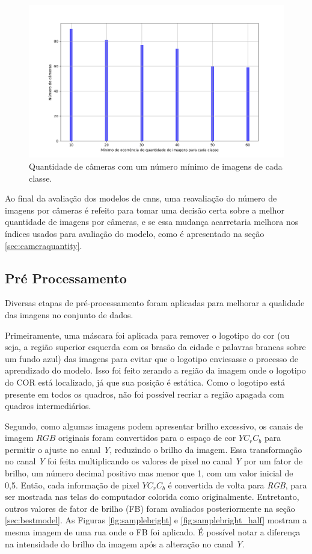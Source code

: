 \begin{figure}[htb]
\centerline{\includegraphics[width=1\linewidth]{images/balancedcodes.png}}
\caption{Quantidade de câmeras com um número mínimo de imagens de cada classe.}
\label{fig:balancedcodes}
\end{figure}

Ao final da avaliação dos modelos de \acrshort{cnn}s, uma reavaliação do número de imagens por câmeras é refeito para tomar uma decisão certa sobre a melhor quantidade de imagens por câmeras, 
e se essa mudança acarretaria melhora nos índices usados para avaliação do modelo, como é apresentado na seção \ref{sec:cameraquantity}.
\subsection{Pré Processamento}\label{subsec:datapreprocessing}

Diversas etapas de pré-processamento foram aplicadas para melhorar a qualidade das imagens no conjunto de dados.

Primeiramente, uma máscara foi aplicada para remover o logotipo do \acrshort{cor} (ou seja, a região superior esquerda com os brasão da cidade e palavras brancas sobre um fundo azul) das imagens para evitar que o logotipo enviesasse o processo de aprendizado do modelo. Isso foi feito zerando a região da imagem onde o logotipo do COR está localizado, já que sua posição é estática. Como o logotipo está presente em todos os quadros, não foi possível recriar a região apagada com quadros intermediários.

Segundo, como algumas imagens podem apresentar brilho excessivo, os canais de imagem $RGB$ originais foram convertidos para o espaço de cor $YC_rC_b$ para permitir o ajuste no canal \textit{Y}, 
reduzindo o brilho da imagem. Essa transformação no canal \textit{Y} foi feita multiplicando os valores de pixel no canal \textit{Y} por um fator de brilho, 
um número decimal positivo mas menor que 1, com um valor inicial de 0,5. 
Então, cada informação de pixel $YC_rC_b$ é convertida de volta para  \textit{RGB}, para ser mostrada nas telas do computador colorida como originalmente. 
Entretanto, outros valores de fator de brilho (FB) foram avaliados posteriormente na seção \ref{sec:bestmodel}.
As Figuras \ref{fig:samplebright} e \ref{fig:samplebright_half} mostram a mesma imagem de uma rua onde o FB foi aplicado. É possível notar a diferença na intensidade do brilho da imagem após a alteração no canal \textit{Y}.


